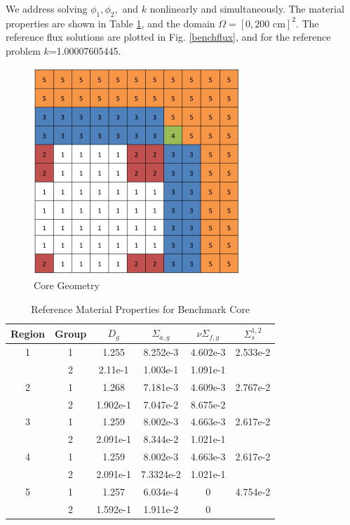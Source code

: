 \documentclass[11pt]{article}
\begin{document}
We address solving $\phi_1,\phi_2,$ and $k$ nonlinearly and simultaneously.  
The material properties are shown in Table \ref{tab:coremats}, and the domain $\Omega=[0,200\text{ cm}]^2$.  The reference flux solutions are plotted in Fig. \ref{benchflux}, and for the reference problem $k$=1.00007605445.
\begin{figure}[H]
\centering
  \includegraphics[width=0.4\linewidth]{core}
  \caption{Core Geometry}
  \label{geom}
\end{figure}
\begin{table}[h]
\centering
\begin{tabular}{c c | c c c c}
Region & Group & $D_g$ & $\Sigma_{a,g}$ & $\nu\Sigma_{f,g}$ & $\Sigma_s^{1,2}$ \\ \hline
1 & 1 & 1.255 & 8.252e-3 & 4.602e-3 & 2.533e-2 \\
 & 2 & 2.11e-1 & 1.003e-1 & 1.091e-1 & \\ \hline
2 & 1 & 1.268 & 7.181e-3 & 4.609e-3 & 2.767e-2 \\
 & 2 & 1.902e-1 & 7.047e-2 & 8.675e-2 & \\ \hline
3 & 1 & 1.259 & 8.002e-3 & 4.663e-3 & 2.617e-2 \\
 & 2 & 2.091e-1 & 8.344e-2 & 1.021e-1 & \\ \hline
4 & 1 & 1.259 & 8.002e-3 & 4.663e-3 & 2.617e-2 \\
 & 2 & 2.091e-1 & 7.3324e-2 & 1.021e-1 & \\ \hline
5 & 1 & 1.257 & 6.034e-4 & 0 & 4.754e-2 \\
 & 2 & 1.592e-1 & 1.911e-2 & 0 & 
\end{tabular}
\caption{Reference Material Properties for Benchmark Core}
\label{tab:coremats}
\end{table}
\end{document}
